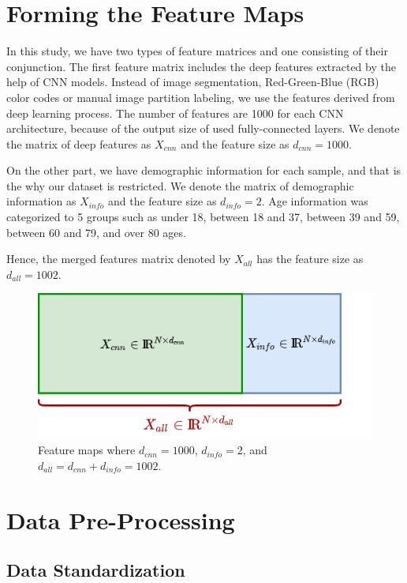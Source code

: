 \section{Forming the Feature Maps} \label{sec:CH5_forming_features}

In this study, we have two types of feature matrices and one consisting of their conjunction. The first feature matrix includes the deep features extracted by the help of CNN models. Instead of image segmentation, Red-Green-Blue (RGB) color codes or manual image partition labeling, we use the features derived from deep learning process. The number of features are 1000 for each CNN architecture, because of the output size of used fully-connected layers. We denote the matrix of deep features as $X_{cnn}$ and the feature size as $d_{cnn} = 1000$.

On the other part, we have demographic information for each sample, and that is the why our dataset is restricted. We denote the matrix of demographic information as $X_{info}$ and the feature size as $d_{info} = 2$. Age information was categorized to 5 groups such as under 18, between 18 and 37, between 39 and 59, between 60 and 79, and over 80 ages.

Hence, the merged features matrix denoted by $X_{all}$ has the feature size as $d_{all} = 1002$.

\begin{figure}[h]
    \centering
    \includegraphics[width=.6\linewidth]{fig/feature_maps.png}
    \vspace{2mm}
    \caption{Feature maps where $d_{cnn} = 1000$, $d_{info} = 2$, and $d_{all} = d_{cnn} + d_{info} = 1002$.}
    \label{fig:feature_maps}
\end{figure}

\section{Data Pre-Processing}

\subsection{Data Standardization}

